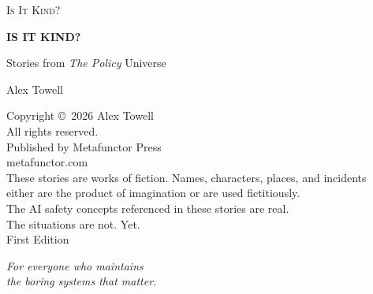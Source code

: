 \documentclass[11pt,twoside]{book}
\begin{document}
\frontmatter
\pagestyle{empty}

\begin{titlepage}
\centering
\vspace*{2.5in}
{\Large\scshape Is It Kind?\par}
\vfill
\end{titlepage}

\begin{titlepage}
\centering
\vspace*{1.5in}
{\Huge\bfseries IS IT KIND?\par}
\vspace{0.4in}
{\large Stories from \textit{The Policy} Universe\par}
\vspace{1.5in}
{\Large Alex Towell\par}
\vfill
\end{titlepage}

\clearpage
\thispagestyle{empty}
\vspace*{\fill}
\begin{center}
\small
Copyright \copyright\ 2026 Alex Towell\\
All rights reserved.\\
\vspace{0.3in}
Published by Metafunctor Press\\
metafunctor.com\\
\vspace{0.3in}
These stories are works of fiction. Names, characters, places, and incidents\\
either are the product of imagination or are used fictitiously.\\
\vspace{0.3in}
The AI safety concepts referenced in these stories are real.\\
The situations are not. Yet.\\
\vspace{0.3in}
First Edition
\end{center}
\vspace*{\fill}
\clearpage

\clearpage
\thispagestyle{empty}
\vspace*{2in}
\begin{center}
\textit{For everyone who maintains\\the boring systems that matter.}
\end{center}
\clearpage
\end{document}
